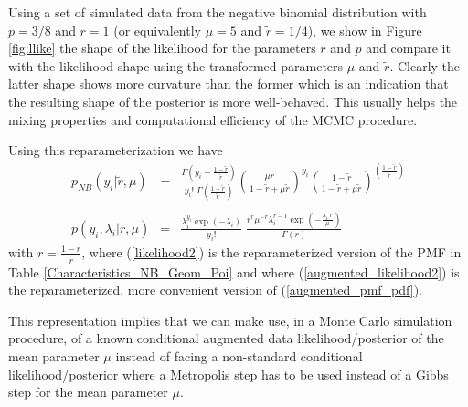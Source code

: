 \documentclass[11pt]{article}
\begin{document}

Using a set of simulated data from the negative binomial distribution with $p=3/8$ and $r=1$ (or equivalently $\mu = 5$ and $\tilde r = 1/4$), we show in Figure \ref{fig:llike} the shape of the likelihood for the parameters  $r$ and $p$ and compare it with the likelihood shape using the transformed parameters $\mu$  and  $\tilde r$. Clearly  the latter shape shows more curvature than the former which is an indication that the resulting shape of the posterior is more well-behaved. This usually helps the mixing properties and computational efficiency of the MCMC procedure.


Using this reparameterization we have
\begin{eqnarray}\label{likelihood2}
%
p_{NB}(y_i|\tilde r,\mu) 
&=& \frac{\Gamma(y_i+ \frac{1-\tilde r}{\tilde r}  )}{y_i! \; 
\Gamma\left( \frac{1-\tilde r}{\tilde r} \right) } 
\left(\frac{\mu \tilde r}{1-\tilde r + \mu \tilde r}\right)^{y_i} 
\left( \frac{ 1-\tilde r}{ 1-\tilde r + \mu \tilde r} \right)^{\left( \frac{1-\tilde r}{\tilde r} \right) } 
\\
\nonumber \\
p(y_i, \lambda_i|\tilde r, \mu) 
&=& 
\frac{\lambda_i^{y_i} \exp(-\lambda_i)}{y_i!}  \; 
\frac{ r^{r} \mu^{-r} \lambda_i^{r-1} \exp \left(- \frac{\lambda_i \; r}{\mu}  \right)}{\Gamma(r)}
 \label{augmented_likelihood2} 
\end{eqnarray}
with $r =\frac{1-\tilde r}{\tilde r}$, where
(\ref{likelihood2}) is the reparameterized version of the PMF in Table \ref{Characteristics_NB_Geom_Poi}
and where (\ref{augmented_likelihood2}) is the reparameterized, more convenient version of (\ref{augmented_pmf_pdf}).


This representation implies that we can make use, in a Monte Carlo simulation procedure, of a known conditional augmented data likelihood/posterior of the mean parameter $\mu$  instead of facing a non-standard conditional likelihood/posterior where a Metropolis step has to be used instead 
of a Gibbs step for the mean parameter $\mu$. 
\end{document}
